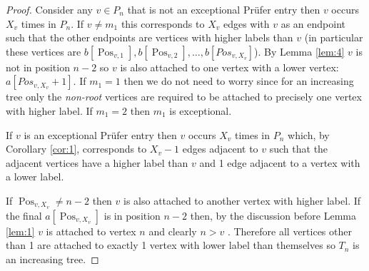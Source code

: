 \documentclass[10pt]{article} %
\newtheorem{cor}[thm]{Corollary}
\theoremstyle{definition}
\DeclareMathOperator{\Pos}{Pos}
\begin{document}
\begin{proof}
Consider any $v \in P_{n}$ that is not an exceptional Pr\"{u}fer entry then $v$ occurs $X_{v}$ times in $P_{n}$.  If $v \neq m_{1}$ this corresponds to $X_{v}$ edges with  $v$ as an endpoint such that the other endpoints are vertices with higher labels than $v$ (in particular these vertices are $b[\Pos_{v,1}],b[\Pos_{v,2}],\dots,b[Pos_{v,X_{v}}]$).  By Lemma \ref{lem:4} $v$ is not in position $n-2$ so $v$ is also attached to one vertex with a lower vertex: $a[Pos_{v,X_{v}} + 1]$. If $m_{1} = 1$ then we do not need to worry since for an increasing tree only the \emph{non-root} vertices are required to be attached to precisely one vertex with higher label. If $m_{1} = 2$ then $m_{1}$ is exceptional.       
 
If $v$ is an exceptional Pr\"{u}fer entry then $v$ occurs $X_{v}$ times in $P_{n}$ which, by Corollary \ref{cor:1}, corresponds to $X_{v} - 1$ edges adjacent to $v$ such that the adjacent vertices have a higher label than $v$ and 1 edge adjacent to a vertex with a lower label. 

If $\Pos_{v,X_{v}} \neq n-2$ then $v$ is also attached to another vertex with higher label.  If the final $a[\Pos_{v,X_{v}}]$ is in position $n-2$ then, by the discussion before Lemma \ref{lem:1} $v$ is attached to vertex $n$ and clearly $n>v$ .  Therefore all vertices other than 1 are attached to exactly 1 vertex with lower label than themselves so $T_{n}$ is an increasing tree.     
\end{proof}















\end{document}

